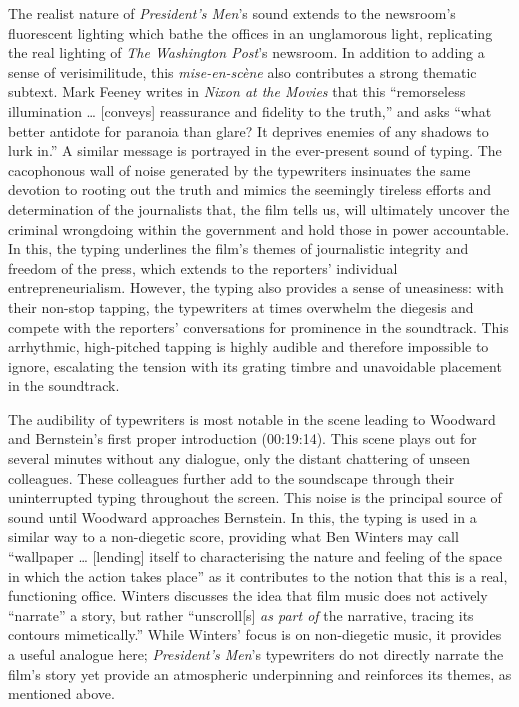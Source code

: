 The realist nature of \textit{President’s Men}’s sound extends to the newsroom’s fluorescent lighting which bathe the offices in an unglamorous light, replicating the real lighting of \textit{The Washington Post}'s newsroom.
In addition to adding a sense of verisimilitude, this \textit{mise-en-scène }also contributes a strong thematic subtext. Mark Feeney writes in \textit{Nixon at the Movies} that this ``remorseless illumination … [conveys] reassurance and fidelity to the truth,” and asks “what better antidote for paranoia than glare? It deprives enemies of any shadows to lurk in.”\autocites[][263]{feeney_nixon_2004} 
A similar message is portrayed in the ever-present sound of typing.
The cacophonous wall of noise generated by the typewriters insinuates the same devotion to rooting out the truth and mimics the seemingly tireless efforts and determination of the journalists that, the film tells us, will ultimately uncover the criminal wrongdoing within the government and hold those in power accountable.
In this, the typing underlines the film’s themes of journalistic integrity and freedom of the press, which extends to the reporters' individual entrepreneurialism.
However, the typing also provides a sense of uneasiness: with their non-stop tapping, the typewriters at times overwhelm the diegesis and compete with the reporters’ conversations for prominence in the soundtrack.
This arrhythmic, high-pitched tapping is highly audible and therefore impossible to ignore, escalating the tension with its grating timbre and unavoidable placement in the soundtrack. 


The audibility of typewriters is most notable in the scene leading to Woodward and Bernstein’s first proper introduction (00:19:14).
This scene plays out for several minutes without any dialogue, only the distant chattering of unseen colleagues.
These colleagues further add to the soundscape through their uninterrupted typing throughout the screen.
This noise is the principal source of sound until Woodward approaches Bernstein.
In this, the typing is used in a similar way to a non-diegetic score, providing what Ben Winters may call ``wallpaper … [lending] itself to characterising the nature and feeling of the space in which the action takes place” as it contributes to the notion that this is a real, functioning office.\autocites[][43]{winters_musical_2012}
Winters discusses the idea that film music does not actively “narrate” a story, but rather ``unscroll[s] \textit{as part of }the narrative, tracing its contours mimetically.”\autocites[][41]{winters_musical_2012}
While Winters’ focus is on non-diegetic music, it provides a useful analogue here;
\textit{President’s Men}’s typewriters do not directly narrate the film’s story yet provide an atmospheric underpinning and reinforces its themes, as mentioned above.

